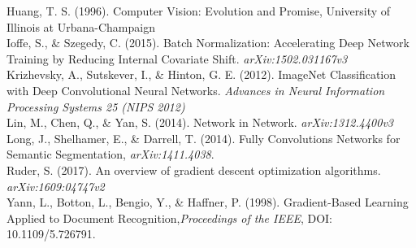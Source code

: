 \documentclass[a4paper]{article}
\begin{document}
Huang, T. S. (1996). Computer Vision: Evolution and Promise, University of Illinois at Urbana-Champaign\\

Ioffe, S., \& Szegedy, C. (2015). Batch Normalization: Accelerating Deep Network Training by Reducing Internal Covariate Shift. \textit{arXiv:1502.031167v3}\\

Krizhevsky, A., Sutskever, I., \& Hinton, G. E. (2012). ImageNet Classification with Deep Convolutional Neural Networks. \textit{Advances in Neural Information Processing Systems 25 (NIPS 2012)}\\

Lin, M., Chen, Q., \& Yan, S. (2014). Network in Network. \textit{arXiv:1312.4400v3}\\

Long, J., Shelhamer, E., \& Darrell, T. (2014). Fully Convolutions Networks for Semantic Segmentation, 	\textit{arXiv:1411.4038}.\\

Ruder, S. (2017). An overview of gradient descent optimization algorithms. \textit{arXiv:1609:04747v2}\\

Yann, L., Botton, L., Bengio, Y., \& Haffner, P. (1998). Gradient-Based Learning Applied to Document Recognition,\textit{Proceedings of the IEEE}, DOI: 10.1109/5.726791.\\
\end{document}
